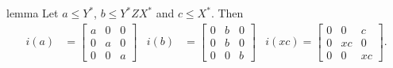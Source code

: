 \documentclass[a4paper,UKenglish,cleveref, autoref, thm-restate]{lipics-v2021}
\begin{document}
\begin{theoremEnd}{lemma}
  Let $a  \leq  Y^*$, $b  \leq  Y^*ZX^*$ and $c  \leq  X^*$.  Then
  \begin{align*}
    i(a)
    & =
      \begin{bmatrix}
        a & 0 & 0 \\
        0 & a & 0 \\
        0 & 0 & a
      \end{bmatrix}
    & i(b)
    & =
      \begin{bmatrix}
        0 & b & 0 \\
        0 & b & 0 \\
        0 & 0 & b
      \end{bmatrix}
    & i(xc)
      =
      \begin{bmatrix}
        0 & 0 & c \\
        0 & xc & 0 \\
        0 & 0 & xc
      \end{bmatrix}.
  \end{align*}
\end{theoremEnd}
\end{document}
